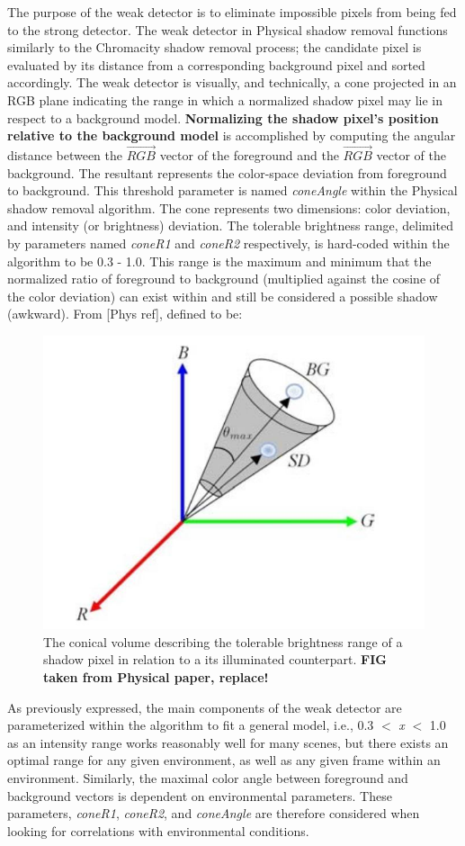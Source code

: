 \documentclass[12pt]{report}
\begin{document}
The purpose of the weak detector is to eliminate impossible pixels from being fed to the strong detector. The weak detector in Physical shadow removal functions similarly to the Chromacity shadow removal process; the candidate pixel is evaluated by its distance from a corresponding background pixel and sorted accordingly. The weak detector is visually, and technically, a cone projected in an RGB plane indicating the range in which a normalized shadow pixel may lie in respect to a background model. \textbf{Normalizing the shadow pixel's position relative to the background model} is accomplished by computing the angular distance between the $\vec{RGB}$ vector of the foreground and the $\vec{RGB}$ vector of the background. The resultant represents the color-space deviation from foreground to background. This threshold parameter is named \textit{coneAngle} within the Physical shadow removal algorithm. The cone represents two dimensions: color deviation, and intensity (or brightness) deviation. The tolerable brightness range, delimited by parameters named \textit{coneR1} and \textit{coneR2} respectively, is hard-coded within the algorithm to be 0.3 - 1.0. This range is the maximum and minimum that the normalized ratio of foreground to background (multiplied against the cosine of the color deviation) can exist within and still be considered a possible shadow (awkward). From [Phys ref], defined to be:

\begin{figure}
  \centering
  \includegraphics[width=.7\linewidth]{figures/cone_physical.jpg}
  \caption{The conical volume describing the tolerable brightness range of a shadow pixel in relation to a its illuminated counterpart. \textbf{FIG taken from Physical paper, replace!}}
  \label{fig:cone_physical}
\end{figure}

As previously expressed, the main components of the weak detector are parameterized within the algorithm to fit a general model, i.e., 0.3 $<$ \textit{x} $<$ 1.0 as an intensity range works reasonably well for many scenes, but there exists an optimal range for any given environment, as well as any given frame within an environment. Similarly, the maximal color angle between foreground and background vectors is dependent on environmental parameters. These parameters, \textit{coneR1}, \textit{coneR2}, and \textit{coneAngle} are therefore considered when looking for correlations with environmental conditions.
\end{document}
